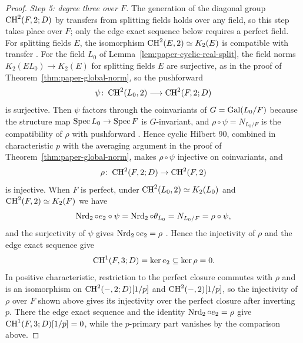 \begin{proof}
\emph{Step 5: degree three over $F$.}
The generation of the diagonal group $\operatorname{CH}^2(F,2;D)$ by transfers from splitting fields holds over any field, so this step takes place over $F$; only the edge exact sequence below requires a perfect field.
For splitting fields $E$, the isomorphism $\operatorname{CH}^2(E,2)\simeq K_2(E)$ is compatible with transfer \cite{NesterenkoSuslin}.
For the field $L_0$ of Lemma~\ref{lem:paper-cyclic-real-split}, the field norms $K_2(EL_0)\to K_2(E)$ for splitting fields $E$ are surjective, as in the proof of Theorem~\ref{thm:paper-global-norm}, so the pushforward
\[
 \psi\colon\operatorname{CH}^2(L_0,2)\longrightarrow\operatorname{CH}^2(F,2;D)
\]
is surjective.
Then $\psi$ factors through the coinvariants of $G=\operatorname{Gal}(L_0/F)$ because the structure map $\operatorname{Spec} L_0\to\operatorname{Spec} F$ is $G$-invariant, and $\rho\circ\psi=N_{L_0/F}$ is the compatibility of $\rho$ with pushforward \cite[Lemma 6.6.4]{KahnLevine2010}.
Hence cyclic Hilbert 90, combined in characteristic $p$ with the averaging argument in the proof of Theorem~\ref{thm:paper-global-norm}, makes $\rho\circ\psi$ injective on coinvariants, and
\[
 \rho\colon\operatorname{CH}^2(F,2;D)\to\operatorname{CH}^2(F,2)
\]
is injective.
When $F$ is perfect, under $\operatorname{CH}^2(L_0,2)\simeq K_2(L_0)$ and $\operatorname{CH}^2(F,2)\simeq K_2(F)$ we have
\[
 \operatorname{Nrd}_2\circ e_2\circ\psi=\operatorname{Nrd}_2\circ\theta_{L_0}=N_{L_0/F}=\rho\circ\psi,
\]
and the surjectivity of $\psi$ gives $\operatorname{Nrd}_2\circ e_2=\rho$ \cite[Proposition 6.6.5]{KahnLevine2010}.
Hence the injectivity of $\rho$ and the edge exact sequence give
\[
 \operatorname{CH}^1(F,3;D)=\ker e_2\subseteq\ker\rho=0.
\]
In positive characteristic, restriction to the perfect closure commutes with $\rho$ and is an isomorphism on $\operatorname{CH}^2(-,2;D)[1/p]$ and $\operatorname{CH}^2(-,2)[1/p]$, so the injectivity of $\rho$ over $F$ shown above gives its injectivity over the perfect closure after inverting $p$.
There the edge exact sequence and the identity $\operatorname{Nrd}_2\circ e_2=\rho$ give $\operatorname{CH}^1(F,3;D)[1/p]=0$, while the $p$-primary part vanishes by the comparison above.
\end{proof}

